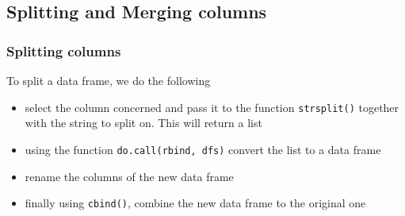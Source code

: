 \documentclass[
]{book}
\newenvironment{Shaded}{\begin{snugshade}}{\end{snugshade}}
\newcommand{\CommentTok}[1]{\textcolor[rgb]{0.56,0.35,0.01}{\textit{#1}}}
\newcommand{\DecValTok}[1]{\textcolor[rgb]{0.00,0.00,0.81}{#1}}
\newcommand{\FunctionTok}[1]{\textcolor[rgb]{0.00,0.00,0.00}{#1}}
\newcommand{\NormalTok}[1]{#1}
\newcommand{\OtherTok}[1]{\textcolor[rgb]{0.56,0.35,0.01}{#1}}
\newcommand{\SpecialCharTok}[1]{\textcolor[rgb]{0.00,0.00,0.00}{#1}}
\providecommand{\tightlist}{%
  \setlength{\itemsep}{0pt}\setlength{\parskip}{0pt}}
\begin{document}
\begin{Shaded}
\end{Shaded}

\hypertarget{splitting-and-merging-columns}{%
\subsection{Splitting and Merging columns}\label{splitting-and-merging-columns}}

\hypertarget{splitting-columns}{%
\subsubsection{Splitting columns}\label{splitting-columns}}

To split a data frame, we do the following

\begin{itemize}
\tightlist
\item
  select the column concerned and pass it to the function \texttt{strsplit()} together with the string to split on. This will return a list
\item
  using the function \texttt{do.call(\textquotesingle{}rbind\textquotesingle{},\ dfs)} convert the list to a data frame
\item
  rename the columns of the new data frame
\item
  finally using \texttt{cbind()}, combine the new data frame to the original one
\end{itemize}
\end{document}
